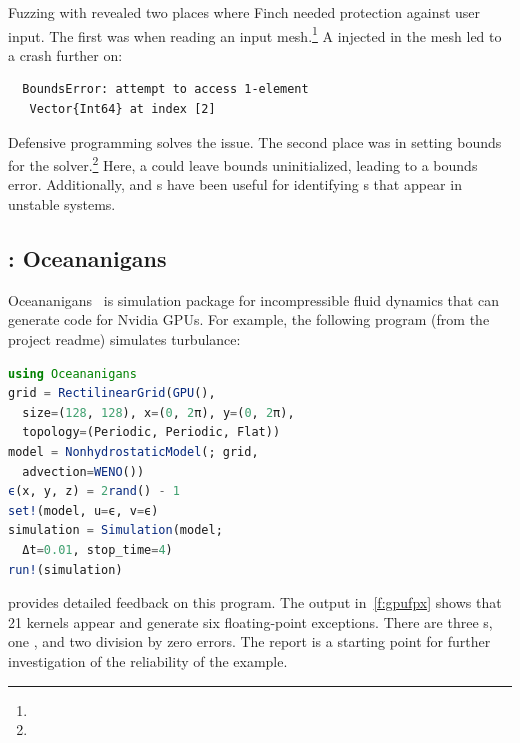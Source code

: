 \documentclass{juliacon}
\begin{document}
Fuzzing with \FT{} revealed two places where Finch needed
protection against user input.
The first was when reading an input mesh.\footnote{}
A \NaN{} injected in the mesh led to a crash further on:

\begin{verbatim}
  BoundsError: attempt to access 1-element
   Vector{Int64} at index [2]
\end{verbatim}

Defensive programming solves the issue.
The second place was in setting bounds for the
solver.\footnote{}
Here, a \NaN{} could leave bounds uninitialized, leading to a bounds error.
Additionally, \FT{} and \CSTG{}s have been useful for identifying \NaN{}s that
appear in unstable systems.

\subsection{\GPUFPX{}: Oceananigans}
\label{s:ocean}

Oceananigans~\cite{OceananigansJOSS} is simulation package for incompressible
fluid dynamics that can generate code for Nvidia GPUs.
For example, the following program (from the project readme) simulates turbulance:

\begin{lstlisting}[language = Julia]
using Oceananigans
grid = RectilinearGrid(GPU(),
  size=(128, 128), x=(0, 2π), y=(0, 2π),
  topology=(Periodic, Periodic, Flat))
model = NonhydrostaticModel(; grid,
  advection=WENO())
ϵ(x, y, z) = 2rand() - 1
set!(model, u=ϵ, v=ϵ)
simulation = Simulation(model;
  Δt=0.01, stop_time=4)
run!(simulation)
\end{lstlisting}

\GPUFPX{} provides detailed feedback on this program.
The output in~\cref{f:gpufpx} shows that 21 kernels
appear and generate six floating-point exceptions.
There are three \NaN{}s, one \Inf{}, and two division
by zero errors.
The report is a starting point for further investigation
of the reliability of the example.
\end{document}
